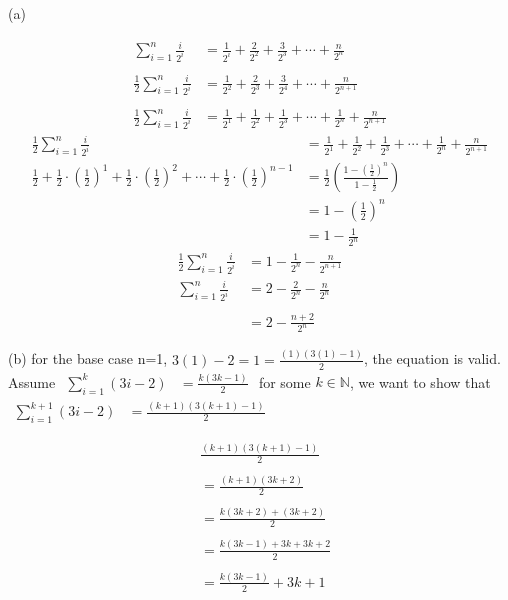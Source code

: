 \documentclass{article}
\begin{document}
(a) \begin{center}
$$\begin{aligned}\sum_{i=1}^n\frac i{2^i}&=\frac1{2^i}+\frac2{2^2}+\frac3{2^3}+\cdots+\frac n{2^n}\\\\\frac12\sum_{i=1}^n\frac i{2^i}&=\frac1{2^2}+\frac2{2^3}+\frac3{2^4}+\cdots+\frac n{2^{n+1}}\\\\\frac12\sum_{i=1}^n\frac i{2^i}&=\frac1{2^1}+\frac1{2^2}+\frac1{2^3}+\cdots+\frac1{2^n}+\frac n{2^{n+1}}\end{aligned}$$
$$\begin{aligned}\frac12\sum_{i=1}^n\frac i{2^i}&=\frac1{2^1}+\frac1{2^2}+\frac1{2^3}+\cdots+\frac1{2^n}+\frac n{2^{n+1}}\\\frac12+\frac12\cdot(\frac12)^1+\frac12\cdot(\frac12)^2+\cdots+\frac12\cdot(\frac12)^{n-1}&=\frac12\left(\frac{1-(\frac12)^n}{1-\frac12}\right)\\&=1-(\frac12)^n\\&=1-\frac1{2^n}\end{aligned}$$
    $$\begin{aligned}\frac12\sum_{i=1}^n\frac i{2^i}&=1-\frac1{2^n}-\frac n{2^{n+1}}\\\sum_{i=1}^n\frac i{2^i}&=2-\frac2{2^n}-\frac n{2^n}\\\\&=2-\frac{n+2}{2^n}\end{aligned}$$
\end{center}

(b) for the base case n=1, $3(1)-2=1=\frac{(1)(3(1)-1)}{2}$, the equation is valid. Assume $\begin{aligned}\sum_{i=1}^k(3i-2)&=\frac{k(3k-1)}2\end{aligned}$ for some $k \in \mathbb{N}$, we want to show that $\begin{aligned}\sum_{i=1}^{k+1}(3i-2)&=\frac{(k+1)(3(k+1)-1)}2\end{aligned}$

$$\begin{aligned}&\frac{\left(k+1\right)\left(3\left(k+1\right)-1\right)}{2}\\\\&=\frac{\left(k+1\right)\left(3k+2\right)}{2}\\\\&=\frac{k\left(3k+2\right)+\left(3k+2\right)}{2}\\\\&=\frac{k\left(3k-1\right)+3k+3k+2}{2}\\\\&=\frac{k\left(3k-1\right)}{2}+3k+1\end{aligned}$$
\end{document}
